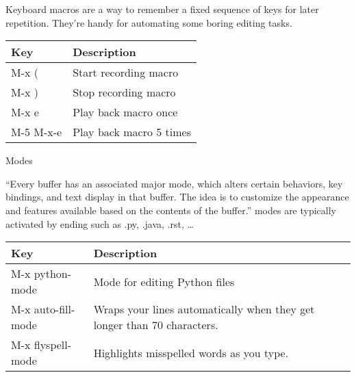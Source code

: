 Keyboard macros are a way to remember a fixed sequence of keys for later
repetition. They're handy for automating some boring editing tasks.

\begin{longtable}[]{@{}ll@{}}
\toprule
Key & Description\tabularnewline
\midrule
\endhead
M-x ( & Start recording macro\tabularnewline
M-x ) & Stop recording macro\tabularnewline
M-x e & Play back macro once\tabularnewline
M-5 M-x-e & Play back macro 5 times\tabularnewline
\bottomrule
\end{longtable}

Modes

``Every buffer has an associated major mode, which alters certain
behaviors, key bindings, and text display in that buffer. The idea is to
customize the appearance and features available based on the contents of
the buffer.'' modes are typically activated by ending such as .py,
.java, .rst, \ldots{}

\begin{longtable}[]{@{}ll@{}}
\toprule
Key & Description\tabularnewline
\midrule
\endhead
M-x python-mode & Mode for editing Python files\tabularnewline
M-x auto-fill-mode & Wraps your lines automatically when they get longer
than 70 characters.\tabularnewline
M-x flyspell-mode & Highlights misspelled words as you
type.\tabularnewline
\bottomrule
\end{longtable}

